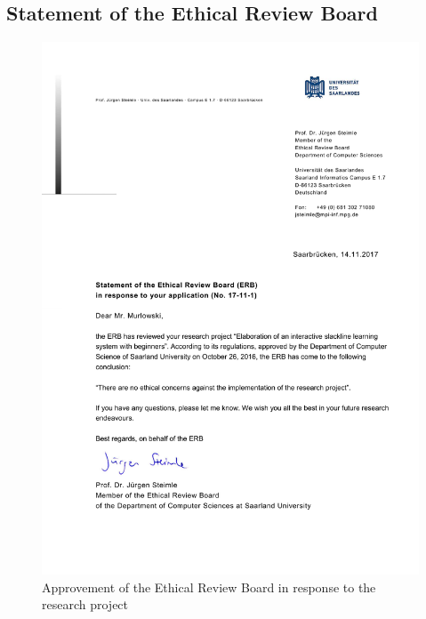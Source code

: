 \begin{appendices}
\chapter{Statement of the Ethical Review Board}
\begin{figure}[htb]
	\centering
	\begin{minipage}[t]{0.62\linewidth}
		\centering
		\includegraphics[width=1\linewidth]{Pictures/App_EthicalReviewFeedback}
		\caption{Approvement of the Ethical Review Board in response to the research project}
		\label{fig:App_DemographicDataHTG}
	\end{minipage}
\end{figure}
\end{appendices}
